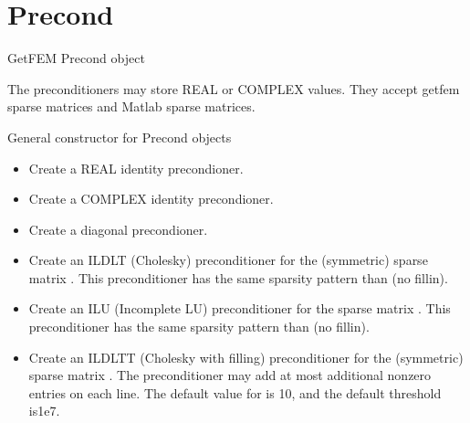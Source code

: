 \documentclass[a4paper,11pt,english]{sphinxmanual}
\begin{document}
\section{Precond}
\label{\detokenize{python/cmdref_Precond:precond}}\label{\detokenize{python/cmdref_Precond::doc}}

\begin{fulllineitems}
\label{\detokenize{python/cmdref_Precond:getfem.Precond}}
GetFEM Precond object

The preconditioners may store REAL or COMPLEX values. They accept getfem
sparse matrices and Matlab sparse matrices.

General constructor for Precond objects
\begin{itemize}
\item {} 
Create a REAL identity precondioner.

\item {} 
Create a COMPLEX identity precondioner.

\item {} 
Create a diagonal precondioner.

\item {} 
Create an ILDLT (Cholesky) preconditioner for the (symmetric) sparse
matrix . This preconditioner has the same sparsity pattern than 
(no fill\sphinxhyphen{}in).

\item {} 
Create an ILU (Incomplete LU) preconditioner for the sparse
matrix . This preconditioner has the same sparsity pattern
than  (no fill\sphinxhyphen{}in).

\item {} 
Create an ILDLTT (Cholesky with filling) preconditioner for the
(symmetric) sparse matrix . The preconditioner may add at most
 additional non\sphinxhyphen{}zero entries on each line. The default value
for  is 10, and the default threshold is1e\sphinxhyphen{}7.


\end{itemize}
\end{fulllineitems}
\end{document}
